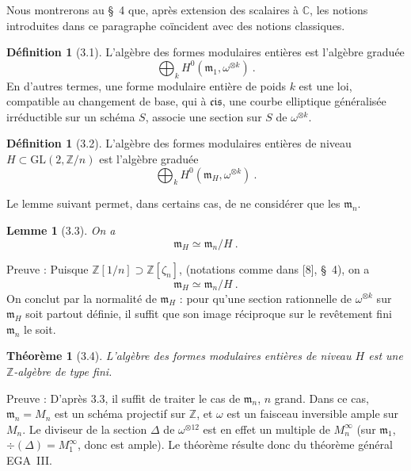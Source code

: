 \documentclass[12pt,a4paper]{amsart}
\theoremstyle{plain}
\newtheorem{theoreme}[proposition]{Th\'eor\`eme}
\newtheorem{lemme}[proposition]{Lemme}
\theoremstyle{definition}
\newtheorem{definition}[proposition]{D\'efinition}
\theoremstyle{remark}
\newcommand{\ZZ}{\mathbb{Z}}
\newcommand{\CC}{\mathbb{C}}
\begin{document}
Nous montrerons au \S~4 que, apr\`es extension des scalaires \`a $\CC$, les notions introduites dans ce paragraphe co\"incident avec des notions classiques.

\begin{definition}[3.1]
L'alg\`ebre des formes modulaires enti\`eres est l'alg\`ebre gradu\'ee
\[
\bigoplus_{k} H^0(\mathfrak{m}_1, \omega^{\otimes k}) \ .
\]
En d'autres termes, une forme modulaire enti\`ere de poids $k$ est une loi, compatible au changement de base, qui \`a $\mathfrak{cis}$, une courbe elliptique g\'en\'eralis\'ee irr\'eductible sur un sch\'ema $S$, associe une section sur $S$ de $\omega^{\otimes k}$.
\end{definition}

\begin{definition}[3.2]
L'alg\`ebre des formes modulaires enti\`eres de niveau $H \subset \mathrm{GL}(2, \ZZ/n)$ est l'alg\`ebre gradu\'ee
\[
\bigoplus_{k} H^0(\mathfrak{m}_H, \omega^{\otimes k}) \ .
\]
\end{definition}

Le lemme suivant permet, dans certains cas, de ne consid\'erer que les $\mathfrak{m}_n$.

\begin{lemme}[3.3]
On a
\[
\mathfrak{m}_H \simeq \mathfrak{m}_n / H \ .
\]
\end{lemme}

\noindent Preuve : Puisque $\ZZ[1/n] \supset \ZZ[\zeta_n]$, (notations comme dans [8], \S~4), on a
\[
\mathfrak{m}_H \simeq \mathfrak{m}_n / H \ .
\]
On conclut par la normalit\'e de $\mathfrak{m}_H$ : pour qu'une section rationnelle de $\omega^{\otimes k}$ sur $\mathfrak{m}_H$ soit partout d\'efinie, il suffit que son image r\'eciproque sur le rev\^etement fini $\mathfrak{m}_n$ le soit.

\begin{theoreme}[3.4]
L'alg\`ebre des formes modulaires enti\`eres de niveau $H$ est une $\ZZ$-alg\`ebre de type fini.
\end{theoreme}

\noindent Preuve : D'apr\`es 3.3, il suffit de traiter le cas de $\mathfrak{m}_n$, $n$ grand. Dans ce cas, $\mathfrak{m}_n = M_n$ est un sch\'ema projectif sur $\ZZ$, et $\omega$ est un faisceau inversible ample sur $M_n$. Le diviseur de la section $\Delta$ de $\omega^{\otimes 12}$ est en effet un multiple de $M_n^\infty$ (sur $\mathfrak{m}_1$, $\div(\Delta) = M_1^\infty$, donc est ample). Le th\'eor\`eme r\'esulte donc du th\'eor\`eme g\'en\'eral EGA~III.
\end{document}
